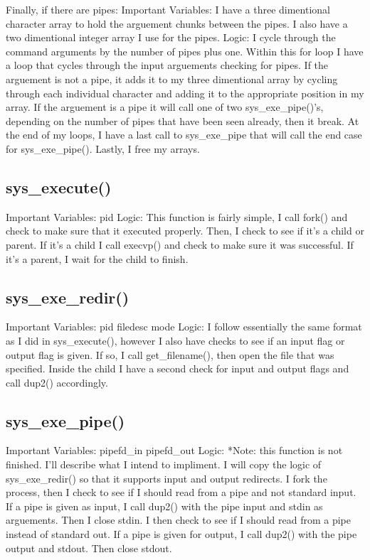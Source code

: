 \documentclass[a4paper, 12pt]{article}
\begin{document}
Finally, if there are pipes:
Important Variables:
I have a three dimentional character array to hold the arguement chunks between the pipes. I also have a two dimentional integer array I use for the pipes.
Logic:
I cycle through the command arguments by the number of pipes plus one. Within this for loop I have a loop that cycles through the input arguements checking for pipes. If the arguement is not a pipe, it adds it to my three dimentional array by cycling through each individual character and adding it to the appropriate position in my array. If the arguement is a pipe it will call one of two sys\_exe\_pipe()'s, depending on the number of pipes that have been seen already, then it break. At the end of my loops, I have a last call to sys\_exe\_pipe that will call the end case for sys\_exe\_pipe(). Lastly, I free my arrays.


\subsection{sys\_execute()}
Important Variables:
pid
Logic:
This function is fairly simple, I call fork() and check to make sure that it executed properly. Then, I check to see if it's a child or parent. If it's a child I call execvp() and check to make sure it was successful. If it's a parent, I wait for the child to finish.
\subsection{sys\_exe\_redir()}
Important Variables:
pid
filedesc
mode
Logic:
I follow essentially the same format as I did in sys\_execute(), however I also have checks to see if an input flag or output flag is given. If so, I call get\_filename(), then open the file that was specified. Inside the child I have a second check for input and output flags and call dup2() accordingly.
\subsection{sys\_exe\_pipe()}
Important Variables:
pipefd\_in
pipefd\_out
Logic:
*Note: this function is not finished. I'll describe what I intend to impliment.
I will copy the logic of sys\_exe\_redir() so that it supports input and output redirects. 
I fork the process, then I check to see if I should read from a pipe and not standard input. If a pipe is given as input, I call dup2() with the pipe input and stdin as arguements. Then I close stdin. I then check to see if I should read from a pipe instead of standard out. If a pipe is given for output, I call dup2() with the pipe output and stdout. Then close stdout. 
\end{document}
